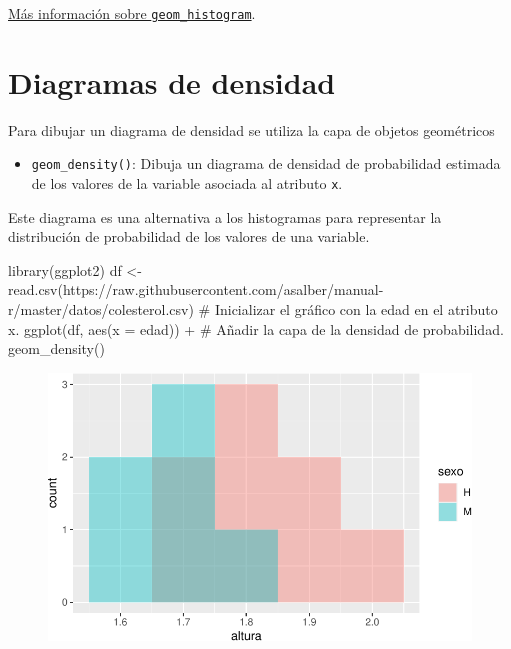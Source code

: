 \documentclass[
  a4paper,
]{scrreport}
\newenvironment{Shaded}{\begin{snugshade}}{\end{snugshade}}
\newcommand{\AttributeTok}[1]{\textcolor[rgb]{0.40,0.45,0.13}{#1}}
\newcommand{\CommentTok}[1]{\textcolor[rgb]{0.37,0.37,0.37}{#1}}
\newcommand{\FunctionTok}[1]{\textcolor[rgb]{0.28,0.35,0.67}{#1}}
\newcommand{\NormalTok}[1]{\textcolor[rgb]{0.00,0.23,0.31}{#1}}
\newcommand{\OtherTok}[1]{\textcolor[rgb]{0.00,0.23,0.31}{#1}}
\newcommand{\SpecialCharTok}[1]{\textcolor[rgb]{0.37,0.37,0.37}{#1}}
\newcommand{\StringTok}[1]{\textcolor[rgb]{0.13,0.47,0.30}{#1}}
\providecommand{\tightlist}{%
  \setlength{\itemsep}{0pt}\setlength{\parskip}{0pt}}\usepackage{longtable,booktabs,array}
\theoremstyle{definition}
\theoremstyle{definition}
\theoremstyle{remark}
\begin{document}
\href{https://ggplot2.tidyverse.org/reference/geom_histogram.html}{Más
información sobre \texttt{geom\_histogram}}.

\hypertarget{diagramas-de-densidad}{%
\section{Diagramas de densidad}\label{diagramas-de-densidad}}

Para dibujar un diagrama de densidad se utiliza la capa de objetos
geométricos

\begin{itemize}
\tightlist
\item
  \texttt{geom\_density()}: Dibuja un diagrama de densidad de
  probabilidad estimada de los valores de la variable asociada al
  atributo \texttt{x}.
\end{itemize}

Este diagrama es una alternativa a los histogramas para representar la
distribución de probabilidad de los valores de una variable.

\begin{Shaded}
\begin{Highlighting}[]
\FunctionTok{library}\NormalTok{(ggplot2)}
\NormalTok{df }\OtherTok{\textless{}{-}} \FunctionTok{read.csv}\NormalTok{(}\StringTok{\textquotesingle{}https://raw.githubusercontent.com/asalber/manual{-}r/master/datos/colesterol.csv\textquotesingle{}}\NormalTok{)}
\CommentTok{\# Inicializar el gráfico con la edad en el atributo x.}
\FunctionTok{ggplot}\NormalTok{(df, }\FunctionTok{aes}\NormalTok{(}\AttributeTok{x =}\NormalTok{ edad)) }\SpecialCharTok{+}
\CommentTok{\# Añadir la capa de la densidad de probabilidad.}
    \FunctionTok{geom\_density}\NormalTok{()}
\end{Highlighting}
\end{Shaded}

\begin{figure}[H]

{\centering \includegraphics{./07-graficos_files/figure-pdf/unnamed-chunk-18-1.pdf}

}

\end{figure}
\end{document}
